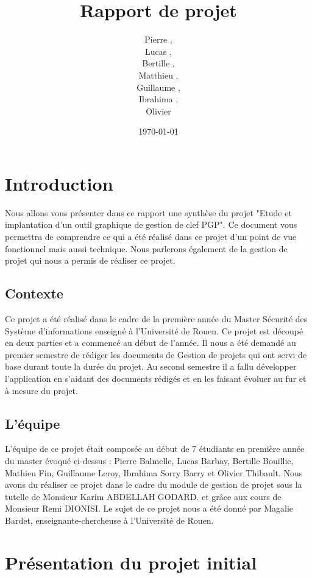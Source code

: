 \documentclass{../res/univ-projet}
\title{Rapport de projet}
\author{Pierre \bsc{Balmelle},\\ Lucas \bsc{Barbay},\\ Bertille \bsc{Bouillie},\\ Matthieu \bsc{Fin},\\ Guillaume \bsc{Leroy},\\ Ibrahima \bsc{Sorry Barry},\\ Olivier \bsc{Thibault}}
\date{\today}
\begin{document}
\maketitle
\newpage
\tableofcontents

\newpage

\section{Introduction}

Nous allons vous présenter dans ce rapport une synthèse du projet "Etude et implantation d'un outil graphique de gestion de clef PGP". Ce document vous permettra de comprendre ce qui a été réalisé dans ce projet d'un point de vue fonctionnel mais aussi technique. Nous parlerons également de la gestion de projet qui nous a permis de réaliser ce projet.

  \subsection{Contexte}
  Ce projet a été réalisé dans le cadre de la première année du Master Sécurité des Système d'informations enseigné à  l'Université de Rouen. Ce projet est découpé en deux parties et a commencé au début de l'année. Il nous a été demandé au premier semestre de rédiger les documents de Gestion de projets qui ont servi de base durant toute la durée du projet. Au second semestre il a fallu développer l'application en s'aidant des documents rédigés et en les faisant évoluer au fur et à mesure du projet.
  \subsection{L'équipe}
  L'équipe de ce projet était composée au début de 7 étudiants en première année du master évoqué ci-dessus : Pierre Balmelle, Lucas Barbay, Bertille Bouillie, Mathieu Fin, Guillaume Leroy, Ibrahima Sorry Barry et Olivier Thibault. Nous avons du réaliser ce projet dans le cadre du module de gestion de projet sous la tutelle de Monsieur Karim ABDELLAH GODARD. et grâce aux cours de Monsieur Remi DIONISI. Le sujet de ce projet nous a été donné par Magalie Bardet, enseignante-chercheuse à l'Université de Rouen.

\section{Présentation du projet initial}
\end{document}
